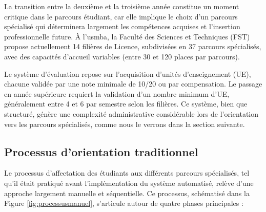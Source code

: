 \documentclass[french,12pt]{report} %
\let\oldfigure\figure
\let\endoldfigure\endfigure
\renewenvironment{figure}[1][H]{
    \oldfigure[#1]\centering
}{
    \endoldfigure
}
\begin{document}
\begin{figure}[H]
\begin{mdframed}[style=figstyle]
\centering
{}
\end{mdframed}
\caption{Structure hiérarchique de l'organisation pédagogique}
\label{fig:structureped}
\end{figure}

La transition entre la deuxième et la troisième année constitue un moment critique dans le parcours étudiant, car elle implique le choix d'un parcours spécialisé qui déterminera largement les compétences acquises et l'insertion professionnelle future. À l'\gls{usmba}, la Faculté des Sciences et Techniques (FST) propose actuellement 14 filières de Licence, subdivisées en 37 parcours spécialisés, avec des capacités d'accueil variables (entre 30 et 120 places par parcours).

Le système d'évaluation repose sur l'acquisition d'unités d'enseignement (UE), chacune validée par une note minimale de 10/20 ou par compensation. Le passage en année supérieure requiert la validation d'un nombre minimum d'UE, généralement entre 4 et 6 par semestre selon les filières. Ce système, bien que structuré, génère une complexité administrative considérable lors de l'orientation vers les parcours spécialisés, comme nous le verrons dans la section suivante.

\subsection{Processus d'orientation traditionnel}

Le processus d'affectation des étudiants aux différents parcours spécialisés, tel qu'il était pratiqué avant l'implémentation du système automatisé, relève d'une approche largement manuelle et séquentielle. Ce processus, schématisé dans la Figure \ref{fig:processusmanuel}, s'articule autour de quatre phases principales :
\end{document}
